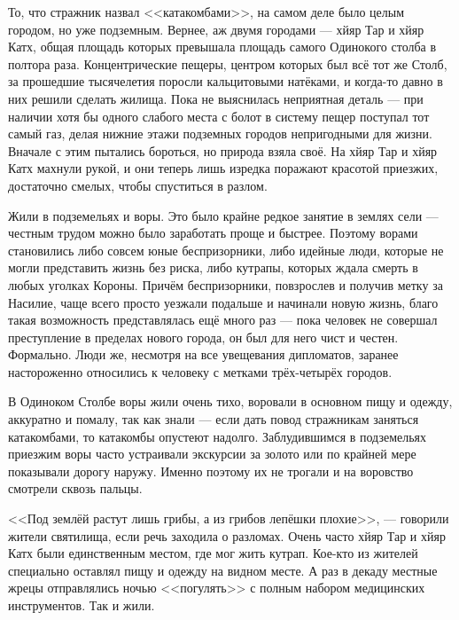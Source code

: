 \asterism

То, что стражник назвал <<катакомбами>>, на самом деле было целым городом, но уже подземным.
Вернее, аж двумя городами --- хйяр Тар и хйяр Катх\FM, общая площадь которых превышала площадь самого Одинокого столба в полтора раза.
Концентрические пещеры\FM, центром которых был всё тот же Столб, за прошедшие тысячелетия поросли кальцитовыми натёками, и когда-то давно в них решили сделать жилища.
Пока не выяснилась неприятная деталь --- при наличии хотя бы одного слабого места с болот в систему пещер поступал тот самый газ, делая нижние этажи подземных городов непригодными для жизни.
Вначале с этим пытались бороться, но природа взяла своё.
На хйяр Тар и хйяр Катх махнули рукой, и они теперь лишь изредка поражают красотой приезжих, достаточно смелых, чтобы спуститься в разлом.

Жили в подземельях и воры.
Это было крайне редкое занятие в землях сели --- честным трудом можно было заработать проще и быстрее.
Поэтому ворами становились либо совсем юные беспризорники, либо идейные люди, которые не могли представить жизнь без риска, либо кутрапы, которых ждала смерть в любых уголках Короны.
Причём беспризорники, повзрослев и получив метку за Насилие, чаще всего просто уезжали подальше и начинали новую жизнь, благо такая возможность представлялась ещё много раз --- пока человек не совершал преступление в пределах нового города, он был для него чист и честен.
Формально.
Люди же, несмотря на все увещевания дипломатов, заранее настороженно относились к человеку с метками трёх-четырёх городов.

В Одиноком Столбе воры жили очень тихо, воровали в основном пищу и одежду, аккуратно и помалу, так как знали --- если дать повод стражникам заняться катакомбами, то катакомбы опустеют надолго.
Заблудившимся в подземельях приезжим воры часто устраивали экскурсии за золото или по крайней мере показывали дорогу наружу.
Именно поэтому их не трогали и на воровство смотрели сквозь пальцы.

<<Под землёй растут лишь грибы, а из грибов лепёшки плохие>>, --- говорили жители святилища, если речь заходила о разломах.
Очень часто хйяр Тар и хйяр Катх были единственным местом, где мог жить кутрап.
Кое-кто из жителей специально оставлял пищу и одежду на видном месте.
А раз в декаду местные жрецы отправлялись ночью <<погулять>> с полным набором медицинских инструментов.
Так и жили.

